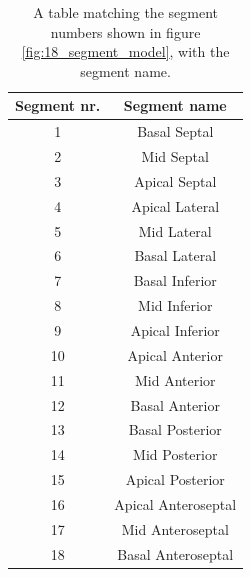 \begin{table}
    \centering
    \begin{tabular}{cc}
        \toprule
        Segment nr. & Segment name \\
        \midrule
        1           & Basal Septal  \\
        2           & Mid Septal  \\
        3           & Apical Septal  \\
        4           & Apical Lateral  \\
        5           & Mid Lateral  \\
        6           & Basal Lateral  \\
        7           & Basal Inferior  \\
        8           & Mid Inferior  \\
        9           & Apical Inferior  \\
        10          & Apical Anterior  \\
        11          & Mid Anterior  \\
        12          & Basal Anterior  \\
        13          & Basal Posterior  \\
        14          & Mid Posterior  \\
        15          & Apical Posterior  \\
        16          & Apical Anteroseptal  \\
        17          & Mid Anteroseptal  \\
        18          & Basal Anteroseptal  \\
        \bottomrule
    \end{tabular}
    \caption{A table matching the segment numbers shown in figure \ref{fig:18_segment_model}, with the segment name.}
    \label{tab:segment_names}
\end{table}

